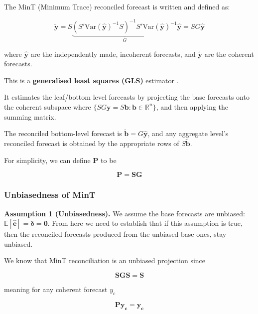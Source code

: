 \documentclass[sn-basic,Numbered,iicol]{sn-jnl}
\theoremstyle{thmstyleone}%
\theoremstyle{thmstyletwo}%
\theoremstyle{thmstylethree}%
\begin{document}
The MinT (Minimum Trace) reconciled forecast is written and defined as:

\begin{equation}
\tilde{\mathbf{y}} = S \underbrace{(S' \text{Var}(\hat{\mathbf{y}})^{-1} S)^{-1} S' \text{Var}(\hat{\mathbf{y}})^{-1}}_{G} \hat{\mathbf{y}} = S G \hat{\mathbf{y}}
\end{equation}

where $\hat{\mathbf{y}}$ are the independently made, incoherent forecasts, and $\tilde{\mathbf{y}}$ are the coherent forecasts.

This is a \textbf{generalised least squares (GLS)} estimator \cite{hyndmanmint}.

It estimates the leaf/bottom level forecasts by projecting the base forecasts onto the coherent subspace where $\{ S G {\mathbf{y}} = S\mathbf{b} : \mathbf{b} \in \mathbb{R}^n \}$, and then applying the summing matrix.

The reconciled bottom-level forecast is $\tilde{\mathbf{b}} = G \hat{\mathbf{y}}$, and any aggregate level's reconciled forecast is obtained by the appropriate rows of $S \tilde{\mathbf{b}}$.

For simplicity, we can define $\mathbf{P}$ to be

\begin{equation}
\mathbf{P} = \mathbf{S}\mathbf{G}
\end{equation}

\subsubsection{Unbiasedness of MinT}\label{subsubsec:unbiased}

\textbf{Assumption 1 (Unbiasedness).} We assume the base forecasts are unbiased: $\mathbb{E}[\hat{\mathbf{e}}] = \boldsymbol{\delta} = \mathbf{0}$. From here we need to establish that if this assumption is true, then the reconciled forecasts produced from the unbiased base ones, stay unbiased.

We know that MinT reconciliation is an unbiased projection \cite{hyndmanmint} since

\begin{equation}
\mathbf{S}\mathbf{G}\mathbf{S} = \mathbf{S}
\end{equation}

meaning for any coherent forecast $y_c$

\begin{equation}
\mathbf{P}\mathbf{y_c} = \mathbf{y_c}
\end{equation}
\end{document}
